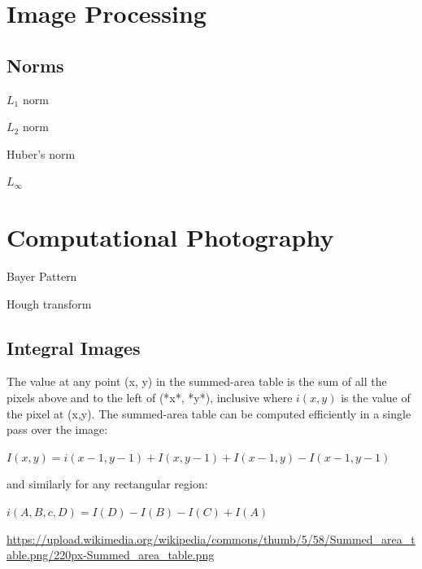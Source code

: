 \section{Image Processing}


\subsection[]{Norms}
$L_1$ norm

$L_2$ norm

Huber’s norm

$L_\infty $


\section{Computational Photography}

Bayer Pattern

Hough transform

 



\subsection{Integral Images}


The value at any point (x, y) in the summed-area table is the sum of all the pixels above and to the left of (*x*, *y*), inclusive where $i(x,y)$  is the value of the pixel at (x,y). The summed-area table can be computed efficiently in a single pass over the image:

$I(x,y) = i(x-1,y-1) + I(x,y-1) + I(x-1,y)-I(x-1,y-1)$

and similarly for any rectangular region:

$ i(A,B,c,D) = I(D) - I(B) - I(C)+I(A)$

\url{https://upload.wikimedia.org/wikipedia/commons/thumb/5/58/Summed_area_table.png/220px-Summed_area_table.png}

